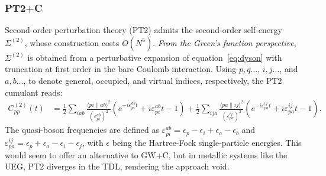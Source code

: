 \documentclass[letterpaper]{article}
\begin{document}
\subsubsection{PT2+C}
Second-order perturbation theory (PT2) admits the second-order self-energy $\Sigma^{(2)}$, whose construction costs $O(N^5)$. \emph{From the Green's function perspective}, $\Sigma^{(2)}$ is obtained from a perturbative expansion of equation~\ref{eq:dyson} with truncation at first order in the bare Coulomb interaction. Using $p, q\ldots$,  $i, j \ldots$, and $a, b \ldots$, to denote general, occupied, and virtual indices, respectively, the PT2 cumulant reads:
\begin{align}
  C_{pp}^{(2)}(t) & = \frac{1}{2} \sum_{i a b}\frac{\langle p i \| a b\rangle^2 }{\left(\varepsilon_{p i}^{a b}\right)^2}\left(e^{-i \varepsilon_{p i}^{a b} t} +i \varepsilon_{p i}^{a b} t -1 \right) +\frac{1}{2}\sum_{i j a} \frac{\langle p a \| i j\rangle^2}{\left(\varepsilon_{p a}^{i j}\right)^2} \left(e^{-i \varepsilon_{p a}^{i j} t} +i \varepsilon_{p a}^{i j} t -1 \right).
\end{align}
The quasi-boson frequencies are defined as $\varepsilon_{p i}^{a b} = \epsilon_p - \epsilon_i + \epsilon_a - \epsilon_b$ and $\varepsilon_{p a}^{i j} = \epsilon_p + \epsilon_a - \epsilon_i - \epsilon_j$, with $\epsilon$ being the Hartree-Fock single-particle energies.
This would seem to offer an alternative to GW+C, but in metallic systems like the UEG, PT2 diverges in the TDL\cite{Fink2016-jh}, rendering the approach void.

\end{document}
